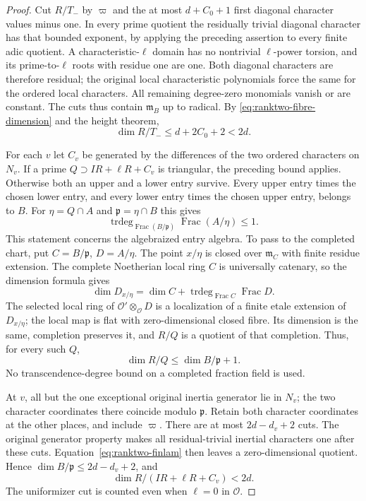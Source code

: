 \begin{proof}
Cut $R/T_-$ by $\varpi$ and the at most $d+C_0+1$ first diagonal
character values minus one.  In every prime quotient the residually
trivial diagonal character has that bounded exponent, by applying
the preceding assertion to every finite adic quotient.  A
characteristic-$\ell$ domain has no nontrivial $\ell$-power torsion,
and its prime-to-$\ell$ roots with residue one are one.  Both
diagonal characters are therefore residual; the original local
characteristic polynomials force the same for the ordered local
characters.  All remaining degree-zero monomials vanish or are
constant.  The cuts thus contain $\mathfrak m_B$ up to radical.
By \eqref{eq:ranktwo-fibre-dimension} and the height theorem,
\begin{equation}\label{eq:ranktwo-triangular-dimension}
                 \dim R/T_-\le d+2C_0+2<2d.
\end{equation}

For each $v$ let $C_v$ be generated by the differences of the two
ordered characters on $N_v$.  If a prime $Q\supset IR+\ell R+C_v$
is triangular, the preceding bound applies.  Otherwise both an upper
and a lower entry survive.  Every upper entry times the chosen lower
entry, and every lower entry times the chosen upper entry, belongs
to $B$.  For $\eta=Q\cap A$ and $\mathfrak p=\eta\cap B$ this gives
\[
 \operatorname{trdeg}_{\operatorname{Frac}(B/\mathfrak p)}
                 \operatorname{Frac}(A/\eta)\le1.
\]
This statement concerns the algebraized entry algebra.  To pass to
the completed chart, put $C=B/\mathfrak p$, $D=A/\eta$.
The point $x/\eta$ is closed over $\mathfrak m_C$ with finite
residue extension.  The complete Noetherian local ring $C$ is
universally catenary, so the dimension formula gives
\[
 \dim D_{x/\eta}=\dim C+
       \operatorname{trdeg}_{\operatorname{Frac}C}\operatorname{Frac}D.
\]
The selected local ring of $\mathcal O'\otimes_{\mathcal O}D$
is a localization of a finite etale extension of $D_{x/\eta}$;
the local map is flat with zero-dimensional closed fibre.
Its dimension is the same, completion preserves it, and $R/Q$ is
a quotient of that completion.  Thus, for every such $Q$,
\begin{equation}\label{eq:ranktwo-completed-dimension}
                         \dim R/Q\le\dim B/\mathfrak p+1.
\end{equation}
No transcendence-degree bound on a completed fraction field is used.
\cite{support-commutative-algebra}

At $v$, all but the one exceptional original inertia generator lie
in $N_v$; the two character coordinates there coincide modulo
$\mathfrak p$.  Retain both character coordinates at the other
places, and include $\varpi$.  There are at most $2d-d_v+2$ cuts.
The original generator property makes all residual-trivial inertial
characters one after these cuts.  Equation~\eqref{eq:ranktwo-finlam}
then leaves a zero-dimensional quotient.  Hence
$\dim B/\mathfrak p\le2d-d_v+2$, and
\begin{equation}\label{eq:ranktwo-coincidence-dimension}
                   \dim R/(IR+\ell R+C_v)<2d.
\end{equation}
The uniformizer cut is counted even when $\ell=0$ in $\mathcal O$.


\end{proof}
